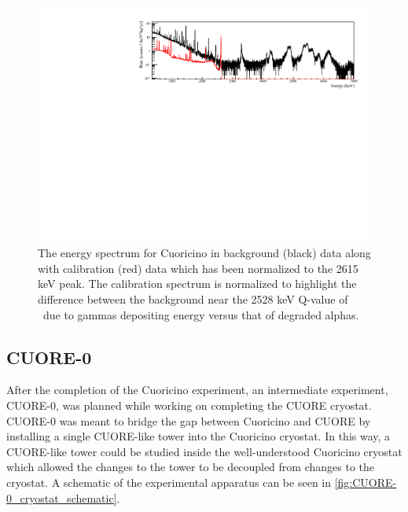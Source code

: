 \begin{figure}[htbp]
    \centering
    \includegraphics[width=0.8\linewidth]{Figures/CuoricinoSpectrum.pdf}
    \caption[The energy spectrum for Cuoricino in background (black) data along with calibration (red) data which has been normalized to the 2615 keV peak.]
    {The energy spectrum for Cuoricino in background (black) data along with calibration (red) data which has been normalized to the 2615 keV peak.
    The calibration spectrum is normalized to highlight the difference between the background near the 2528 keV Q-value of \zeronubb~due to gammas depositing energy versus that of degraded alphas.}
    \label{fig:cuoricino spectrum}
\end{figure}

\subsection{CUORE-0}
\label{ssec:CUORE-0}

After the completion of the Cuoricino experiment, an intermediate experiment, CUORE-0, was planned while working on completing the CUORE cryostat.
CUORE-0 was meant to bridge the gap between Cuoricino and CUORE by installing a single CUORE-like tower into the Cuoricino cryostat.
In this way, a CUORE-like tower could be studied inside the well-understood Cuoricino cryostat which allowed the changes to the tower to be decoupled from changes to the cryostat.
A schematic of the experimental apparatus can be seen in \autoref{fig:CUORE-0_cryostat_schematic}.

